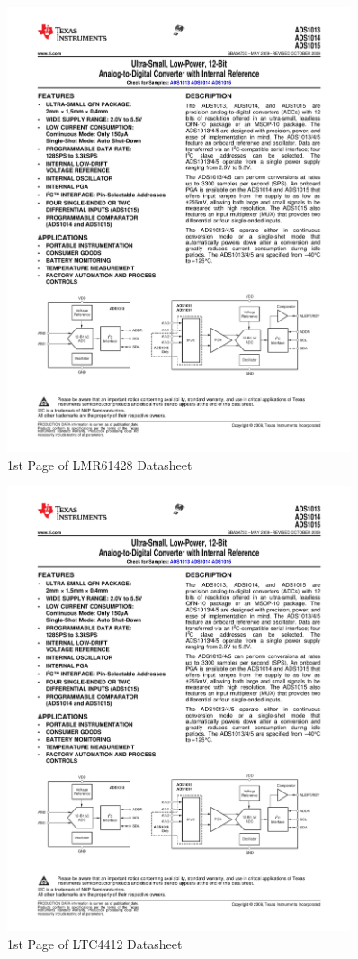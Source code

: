 \documentclass{article}
\numberwithin{figure}{section}
\numberwithin{equation}{section}
\begin{document}
{\begin{figure}[H]
	\centering
	\includegraphics[page=8,width=0.9\textwidth]{combined.pdf}
	\caption{1st Page of LMR61428 Datasheet}
	\label{fig:lmrdat}
\end{figure}

\begin{figure}[H]
	\centering
	\includegraphics[page=9,width=0.9\textwidth]{combined.pdf}
	\caption{1st Page of LTC4412 Datasheet}
	\label{fig:ltc4412dat}
\end{figure}

}
\end{document}
